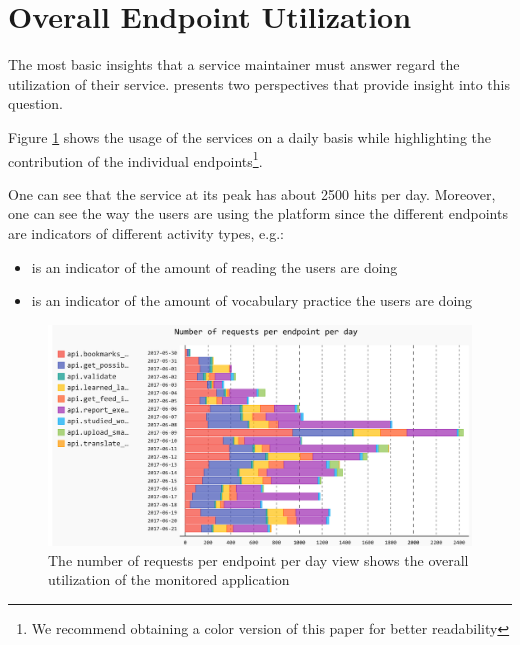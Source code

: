 \documentclass[conference]{IEEEtran}
\begin{document}


\section{Overall Endpoint Utilization}

  The most basic insights that a service maintainer must answer regard the utilization of their service. \tool presents two perspectives that provide insight into this question. 


  Figure \ref{fig:aeu} shows the usage of the services on a daily basis while highlighting the contribution of the individual endpoints\footnote{We recommend obtaining a color version of this paper for better readability}. 

  One can see that the service at its peak has about 2500 hits per day. Moreover, one can see the way the users are using the platform since the different endpoints are indicators of different activity types, e.g.: 

  \begin{itemize}

    \item {\color{myblue}\epTranslations} is an indicator of the amount of reading the users are doing

    \item {\color{myviolet} \epOutcome} is an indicator of the amount of vocabulary practice the users are doing

  \end{itemize}




  \begin{figure}[h!]
    \centering
    \includegraphics[width=\linewidth]{all_endpoints_usage.png}
    \caption{The number of requests per endpoint per day view shows the overall utilization of the monitored application}
    \label{fig:aeu}
  \end{figure}
\end{document}
